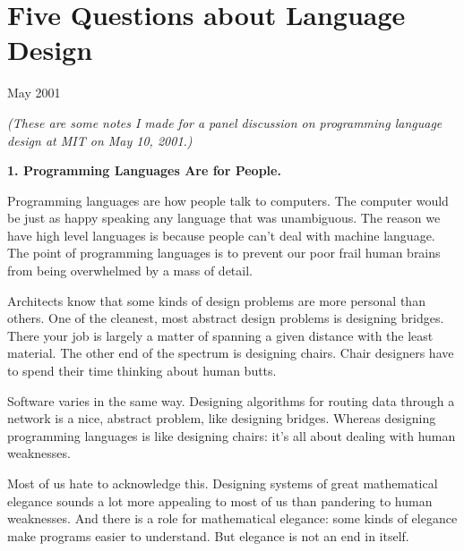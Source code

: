 \chapter{Five Questions about Language Design}


            
              
                

May 2001
                  
                    \emph{(These are some notes I made for a panel discussion on
                      programming language design at MIT on May 10, 2001.)}





\textbf{1. Programming Languages Are for People.}

Programming languages are how people talk to
                    computers. The computer would be just as happy speaking any
                    language that was unambiguous. The reason we have high level
                    languages is because people can't deal with machine
                    language. The point of programming languages is to prevent
                    our poor frail human brains from being overwhelmed by a mass
                    of detail.

Architects know that some kinds of
                    design problems are more personal than others. One of the
                    cleanest, most abstract design problems is designing
                    bridges. There your job is largely a matter of spanning a
                    given distance with the least material. The other end of the
                    spectrum is designing chairs. Chair designers have to spend
                    their time thinking about human butts.

Software
                    varies in the same way. Designing algorithms for routing
                    data through a network is a nice, abstract problem, like
                    designing bridges. Whereas designing programming languages
                    is like designing chairs: it's all about dealing with human
                    weaknesses.

Most of us hate to acknowledge this.
                    Designing systems of great mathematical elegance sounds a
                    lot more appealing to most of us than pandering to human
                    weaknesses. And there is a role for mathematical elegance:
                    some kinds of elegance make programs easier to understand.
                    But elegance is not an end in itself.

